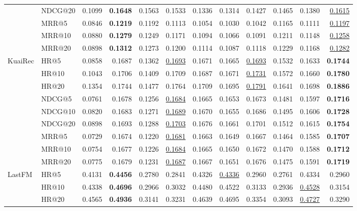 \begin{tabular}{llrrrrrrrrrr}
 & NDCG@20 & 0.1099 & \textbf{0.1648} & 0.1563 & 0.1533 & 0.1336 & 0.1314 & 0.1427 & 0.1465 & 0.1380 & \underline{0.1615} \\
 & MRR@5 & 0.0846 & \textbf{0.1219} & 0.1192 & 0.1113 & 0.1054 & 0.1030 & 0.1042 & 0.1165 & 0.1111 & \underline{0.1197} \\
 & MRR@10 & 0.0880 & \textbf{0.1279} & 0.1249 & 0.1171 & 0.1094 & 0.1066 & 0.1091 & 0.1211 & 0.1148 & \underline{0.1258} \\
 & MRR@20 & 0.0898 & \textbf{0.1312} & 0.1273 & 0.1200 & 0.1114 & 0.1087 & 0.1118 & 0.1229 & 0.1168 & \underline{0.1282} \\
\hline
KuaiRec & HR@5 & 0.0858 & 0.1687 & 0.1362 & \underline{0.1693} & 0.1671 & 0.1665 & \underline{0.1693} & 0.1532 & 0.1633 & \textbf{0.1744} \\
 & HR@10 & 0.1043 & 0.1706 & 0.1409 & 0.1709 & 0.1687 & 0.1671 & \underline{0.1731} & 0.1572 & 0.1660 & \textbf{0.1780} \\
 & HR@20 & 0.1354 & 0.1744 & 0.1477 & 0.1764 & 0.1709 & 0.1695 & \underline{0.1791} & 0.1641 & 0.1698 & \textbf{0.1886} \\
 & NDCG@5 & 0.0761 & 0.1678 & 0.1256 & \underline{0.1684} & 0.1665 & 0.1653 & 0.1673 & 0.1481 & 0.1597 & \textbf{0.1716} \\
 & NDCG@10 & 0.0820 & 0.1683 & 0.1271 & \underline{0.1689} & 0.1670 & 0.1655 & 0.1686 & 0.1495 & 0.1606 & \textbf{0.1728} \\
 & NDCG@20 & 0.0898 & 0.1693 & 0.1288 & \underline{0.1703} & 0.1676 & 0.1661 & 0.1701 & 0.1512 & 0.1615 & \textbf{0.1754} \\
 & MRR@5 & 0.0729 & 0.1674 & 0.1220 & \underline{0.1681} & 0.1663 & 0.1649 & 0.1667 & 0.1464 & 0.1585 & \textbf{0.1707} \\
 & MRR@10 & 0.0754 & 0.1677 & 0.1226 & \underline{0.1684} & 0.1665 & 0.1650 & 0.1672 & 0.1470 & 0.1588 & \textbf{0.1712} \\
 & MRR@20 & 0.0775 & 0.1679 & 0.1231 & \underline{0.1687} & 0.1667 & 0.1651 & 0.1676 & 0.1475 & 0.1591 & \textbf{0.1719} \\
\hline
LastFM & HR@5 & 0.4131 & \textbf{0.4456} & 0.2780 & 0.2841 & 0.4326 & \underline{0.4336} & 0.2960 & 0.2761 & 0.4334 & 0.2960 \\
 & HR@10 & 0.4338 & \textbf{0.4696} & 0.2966 & 0.3032 & 0.4480 & 0.4522 & 0.3133 & 0.2936 & \underline{0.4528} & 0.3154 \\
 & HR@20 & 0.4565 & \textbf{0.4936} & 0.3141 & 0.3231 & 0.4639 & 0.4695 & 0.3354 & 0.3093 & \underline{0.4727} & 0.3290 \\

\end{tabular}
